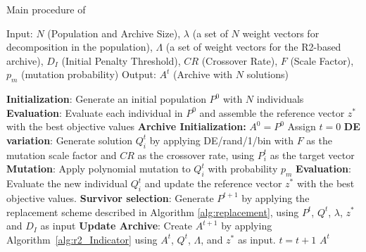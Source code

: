 \begin{algorithm}[!t]
        \caption{Main procedure of \AVSDMOEAD{}}
        \begin{small}
\begin{algorithmic}[1]
				\STATE Input: $N$ (Population and Archive Size), $\lambda$ (a set of $N$ weight vectors for decomposition in the population),
				$\Lambda$ (a set of weight vectors for the R2-based archive), $D_I$ (Initial Penalty Threshold), $CR$ (Crossover Rate),
				$F$ (Scale Factor), $p_m$ (mutation probability)
        \STATE Output: $A^{t}$ (Archive with $N$ solutions)

        \STATE \textbf{Initialization}: Generate an initial population $P^0$ with $N$ individuals \label{alg_1:1}
        \STATE \textbf{Evaluation}: Evaluate each individual in $P^0$ and assemble the reference vector $z^*$ with the best objective values \label{alg_1:3}
				\STATE \textbf{Archive Initialization:} $A^0 = P^0$
        \STATE Assign $t=0$ \label{alg_1:4}
         \label{alg_1:5}
            \label{alg_1:6}
               \STATE \textbf{DE variation}: Generate solution $Q^t_{i}$ by applying DE/rand/1/bin with $F$ as the mutation scale factor and $CR$ as the crossover rate, using $P_{i}^t$ as the target vector \label{alg_1:8}
							 \STATE \textbf{Mutation}: Apply polynomial mutation to $Q^t_{i}$ with probability $p_m$
               \STATE \textbf{Evaluation}: Evaluate the new individual $Q^t_{i}$ and update the reference vector $z^*$ with the best objective values. \label{alg_1:9}
           \ENDFOR \label{alg_1:10}
           \STATE \textbf{Survivor selection}: Generate $P^{t+1}$ by applying the replacement scheme described in Algorithm \ref{alg:replacement}, using $P^t$, $Q^t$, $\lambda$, $z^*$ and $D_I$ as input \label{alg_1:11}
	   \STATE \textbf{Update Archive}: Create $A^{t+1}$ by applying Algorithm~\ref{alg:r2_Indicator} using $A^{t}$, $Q^t$, $\Lambda$, and $z^*$ as input. \label{alg_1:11bis}
           \STATE $t=t+1$ \label{alg_1:12}
        \ENDWHILE \label{alg_1:13}
        \RETURN $A^{t}$ 
        \end{algorithmic}
        \end{small}
\label{alg:vsd-moead}
\end{algorithm}


